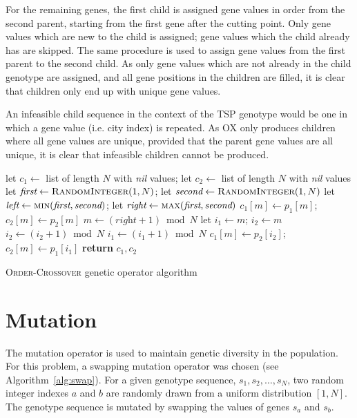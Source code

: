 For the remaining genes, the first child is assigned gene values in order from the second parent, starting from the first gene after the cutting point. Only gene values which are new to the child is assigned; gene values which the child already has are skipped. The same procedure is used to assign gene values from the first parent to the second child. As only gene values which are not already in the child genotype are assigned, and all gene positions in the children are filled, it is clear that children only end up with unique gene values.

An infeasible child sequence in the context of the \ac{TSP} genotype would be one in which a gene value (i.e. city index) is repeated. As \ac{OX} only produces children where all gene values are unique, provided that the parent gene values are all unique, it is clear that infeasible children cannot be produced.

\begin{algorithm}
\begin{algorithmic}[1]
    \State let $c_1 \gets$ list of length $N$ with \textit{nil} values; let $c_2 \gets$ list of length $N$ with \textit{nil} values
    \State let $\textit{first} \gets \textsc{RandomInteger}(1, N)$; let $\textit{second} \gets \textsc{RandomInteger}(1, N)$
    \State let $\textit{left} \gets \textsc{min}(\textit{first}, \textit{second})$; let $\textit{right} \gets \textsc{max}(\textit{first}, \textit{second})$
        \State $c_1[m] \gets p_1[m]$; $c_2[m] \gets p_2[m]$
    \EndFor
    \State $m \gets (\textit{right} + 1) \bmod N$
    \State let $i_1 \gets m$; $i_2 \gets m$
            \State $i_2 \gets (i_2 + 1) \bmod N$
        \EndWhile
            \State $i_1 \gets (i_1 + 1) \bmod N$
        \EndWhile
        \State $c_1[m] \gets p_2[i_2]$; $c_2[m] \gets p_1[i_1]$
    \EndWhile
    \State \textbf{return} $c_1, c_2$
\EndFunction
\end{algorithmic}
\caption{\textsc{Order-Crossover} genetic operator algorithm}
\label{alg:ox}
\end{algorithm}

\section*{Mutation}

The mutation operator is used to maintain genetic diversity in the population. For this problem, a swapping mutation operator was chosen (see Algorithm~\ref{alg:swap}). For a given genotype sequence, $s_1, s_2, \dots, s_N$, two random integer indexes $a$ and $b$ are randomly drawn from a uniform distribution $[1, N]$. The genotype sequence is mutated by swapping the values of genes $s_a$ and $s_b$.

